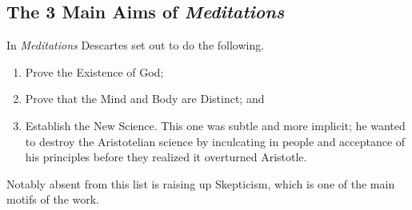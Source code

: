 \subsection{The 3 Main Aims of \emph{Meditations}}

In \emph{Meditations} Descartes set out to do the following.
\begin{enumerate}
\item Prove the Existence of God;
\item Prove that the Mind and Body are Distinct; and
\item Establish the New Science. This one was subtle and more implicit; he wanted to destroy the Aristotelian science by inculcating in people and acceptance of his principles before they realized it overturned Aristotle.
\end{enumerate}

Notably absent from this list is raising up Skepticism, which is one of the main motifs of the work.
